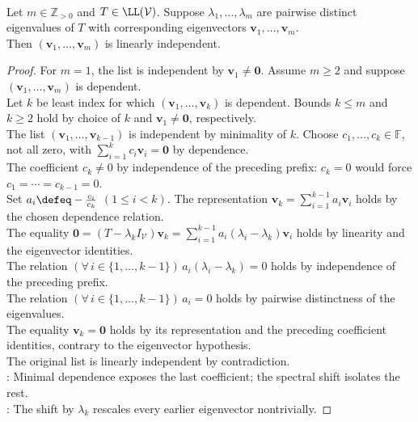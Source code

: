 \begin{theorem} \label{thm:distinct-eigenvalues-independent-eigenvectors} \\
Let $m\in\mathbb{Z}_{>0}$ and $T\in\LL(\mathcal{V})$. Suppose $\lambda_1,\ldots,\lambda_m$ are pairwise distinct eigenvalues of $T$ with corresponding eigenvectors $\mathbf{v}_1,\ldots,\mathbf{v}_m$.\\
Then $(\mathbf{v}_1,\ldots,\mathbf{v}_m)$ is linearly independent.
\begin{proof}
For $m=1$, the list is independent by $\mathbf{v}_1\neq\mathbf{0}$. Assume $m\geq2$ and suppose $(\mathbf{v}_1,\ldots,\mathbf{v}_m)$ is dependent.\\
Let $k$ be least index for which $(\mathbf{v}_1,\ldots,\mathbf{v}_k)$ is dependent. Bounds $k\leq m$ and $k\geq2$ hold by choice of $k$ and $\mathbf{v}_1\neq\mathbf{0}$, respectively.\\
The list $(\mathbf{v}_1,\ldots,\mathbf{v}_{k-1})$ is independent by minimality of $k$. Choose $c_1,\ldots,c_k\in\mathbb{F}$, not all zero, with $\sum\limits_{i=1}^{k}c_i\mathbf{v}_i=\mathbf{0}$ by dependence.\\
The coefficient $c_k\neq0$ by independence of the preceding prefix: $c_k=0$ would force $c_1=\cdots=c_{k-1}=0$.\\
Set $a_i\defeq-\frac{c_i}{c_k}$ $(1\leq i<k)$. The representation $\mathbf{v}_k=\sum\limits_{i=1}^{k-1}a_i\mathbf{v}_i$ holds by the chosen dependence relation.\\
The equality $\mathbf{0}=(T-\lambda_kI_{\mathcal{V}})\mathbf{v}_k=\sum\limits_{i=1}^{k-1}a_i(\lambda_i-\lambda_k)\mathbf{v}_i$ holds by linearity and the eigenvector identities.\\
The relation $(\forall\,i\in\{1,\ldots,k-1\})\,a_i(\lambda_i-\lambda_k)=0$ holds by independence of the preceding prefix.\\
The relation $(\forall\,i\in\{1,\ldots,k-1\})\,a_i=0$ holds by pairwise distinctness of the eigenvalues.\\
The equality $\mathbf{v}_k=\mathbf{0}$ holds by its representation and the preceding coefficient identities, contrary to the eigenvector hypothesis.\\
The original list is linearly independent by contradiction.\\
: Minimal dependence exposes the last coefficient; the spectral shift isolates the rest.\\
: The shift by $\lambda_k$ rescales every earlier eigenvector nontrivially.
\end{proof}
\end{theorem}

